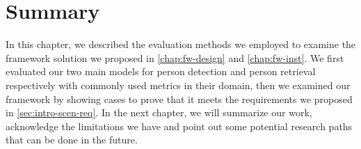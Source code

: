 \section{Summary}

In this chapter, we described the evaluation methods we employed to examine the
framework solution we proposed in \autoref{chap:fw-design} and
\autoref{chap:fw-inst}. We first evaluated our two main models for person
detection and person retrieval respectively with commonly used metrics in their
domain, then we examined our framework by showing cases to prove that it meets the
requirements we proposed in \autoref{sec:intro-scen-req}.
In the next chapter, we will summarize our work, acknowledge the limitations we
have and point out some potential research paths that can be done in the future.

